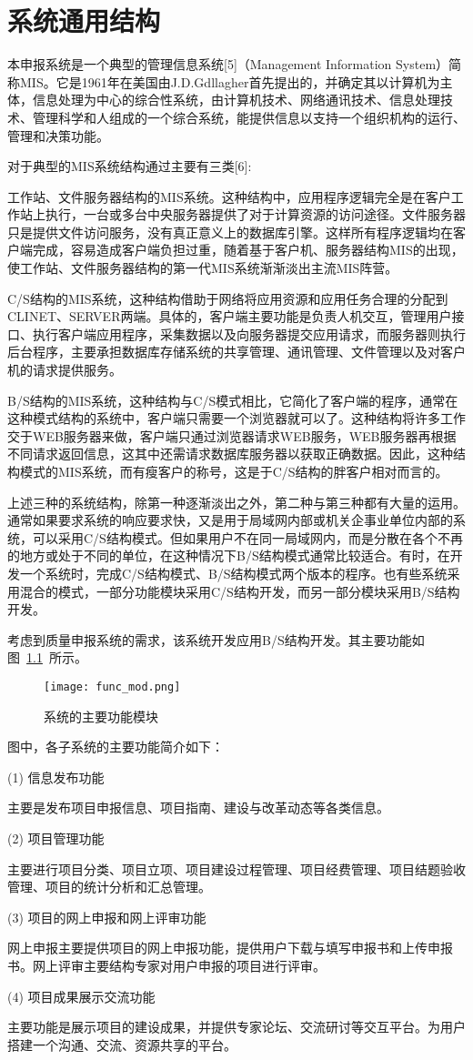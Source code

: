 
\chapter{系统通用结构}
本申报系统是一个典型的管理信息系统[5]（Management Information System）简称MIS。它是1961年在美国由J.D.Gdllagher首先提出的，并确定其以计算机为主体，信息处理为中心的综合性系统，由计算机技术、网络通讯技术、信息处理技术、管理科学和人组成的一个综合系统，能提供信息以支持一个组织机构的运行、管理和决策功能。

对于典型的MIS系统结构通过主要有三类[6]:\par
工作站、文件服务器结构的MIS系统。这种结构中，应用程序逻辑完全是在客户工作站上执行，一台或多台中央服务器提供了对于计算资源的访问途径。文件服务器只是提供文件访问服务，没有真正意义上的数据库引擎。这样所有程序逻辑均在客户端完成，容易造成客户端负担过重，随着基于客户机、服务器结构MIS的出现，使工作站、文件服务器结构的第一代MIS系统渐渐淡出主流MIS阵营。

C/S结构的MIS系统，这种结构借助于网络将应用资源和应用任务合理的分配到CLINET、SERVER两端。具体的，客户端主要功能是负责人机交互，管理用户接口、执行客户端应用程序，采集数据以及向服务器提交应用请求，而服务器则执行后台程序，主要承担数据库存储系统的共享管理、通讯管理、文件管理以及对客户机的请求提供服务。

B/S结构的MIS系统，这种结构与C/S模式相比，它简化了客户端的程序，通常在这种模式结构的系统中，客户端只需要一个浏览器就可以了。这种结构将许多工作交于WEB服务器来做，客户端只通过浏览器请求WEB服务，WEB服务器再根据不同请求返回信息，这其中还需请求数据库服务器以获取正确数据。因此，这种结构模式的MIS系统，而有瘦客户的称号，这是于C/S结构的胖客户相对而言的。

上述三种的系统结构，除第一种逐渐淡出之外，第二种与第三种都有大量的运用。通常如果要求系统的响应要求快，又是用于局域网内部或机关企事业单位内部的系统，可以采用C/S结构模式。但如果用户不在同一局域网内，而是分散在各个不再的地方或处于不同的单位，在这种情况下B/S结构模式通常比较适合。有时，在开发一个系统时，完成C/S结构模式、B/S结构模式两个版本的程序。也有些系统采用混合的模式，一部分功能模块采用C/S结构开发，而另一部分模块采用B/S结构开发。

考虑到质量申报系统的需求，该系统开发应用B/S结构开发。其主要功能如图~\ref{fig:func_mod}~所示。
\begin{figure}[htbp]
\centering
\texttt{[image: func\_mod.png]}
\caption{系统的主要功能模块}\label{fig:func_mod}
\vspace{\baselineskip}
\end{figure}
图中，各子系统的主要功能简介如下：

(1)	信息发布功能\par
主要是发布项目申报信息、项目指南、建设与改革动态等各类信息。

(2)	项目管理功能\par
主要进行项目分类、项目立项、项目建设过程管理、项目经费管理、项目结题验收管理、项目的统计分析和汇总管理。

(3)	项目的网上申报和网上评审功能\par
网上申报主要提供项目的网上申报功能，提供用户下载与填写申报书和上传申报书。网上评审主要结构专家对用户申报的项目进行评审。

(4)	项目成果展示交流功能\par
主要功能是展示项目的建设成果，并提供专家论坛、交流研讨等交互平台。为用户搭建一个沟通、交流、资源共享的平台。
